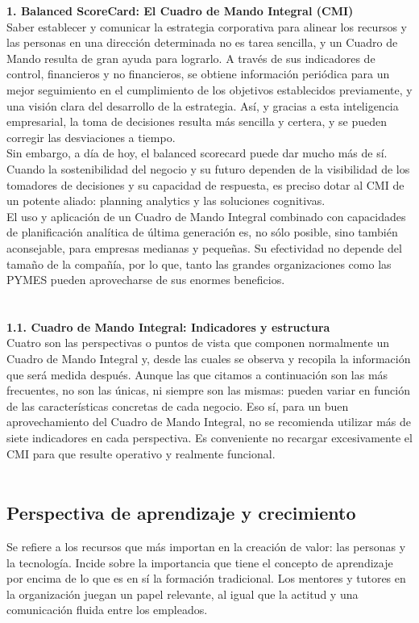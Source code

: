\documentclass[twoside,twocolumn]{article}
\begin{document}
\begin{flushright}
\begin{itemize}
\textbf{1.  Balanced ScoreCard: El Cuadro de Mando Integral (CMI)}\\
Saber establecer y comunicar la estrategia corporativa para alinear los recursos y las personas en una dirección determinada no es tarea sencilla, y un Cuadro de Mando resulta de gran ayuda para lograrlo. A través de sus indicadores de control, financieros y no financieros, se obtiene información periódica para un mejor seguimiento en el cumplimiento de los objetivos establecidos previamente, y una visión clara del desarrollo de la estrategia. Así, y gracias a esta inteligencia empresarial, la toma de decisiones resulta más sencilla y certera, y se pueden corregir las desviaciones a tiempo.\\
Sin embargo, a día de hoy, el balanced scorecard puede dar mucho más de sí.
\textbf{}\\
Cuando la sostenibilidad del negocio y su futuro dependen de la visibilidad de los tomadores de decisiones y su capacidad de respuesta, es preciso dotar al CMI de un potente aliado: planning analytics y las soluciones cognitivas.\\
El uso y aplicación de un Cuadro de Mando Integral combinado con capacidades de planificación analítica de última generación es, no sólo posible, sino también aconsejable, para empresas medianas y pequeñas. Su efectividad no depende del tamaño de la compañía, por lo que, tanto las grandes organizaciones como las PYMES pueden aprovecharse de sus enormes beneficios.\\

\textbf{}\\\textbf{}\\
 \textbf{1.1.  Cuadro de Mando Integral: Indicadores y estructura }\\
Cuatro son las perspectivas o puntos de vista que componen normalmente un Cuadro de Mando Integral y, desde las cuales se observa y recopila la información que será medida después. Aunque las que citamos a continuación son las más frecuentes, no son las únicas, ni siempre son las mismas: pueden variar en función de las características concretas de cada negocio.
Eso sí, para un buen aprovechamiento del Cuadro de Mando Integral, no se recomienda utilizar más de siete indicadores en cada perspectiva. Es conveniente no recargar excesivamente el CMI para que resulte operativo y realmente funcional.\\
\textbf{}\\

\subsection{Perspectiva de aprendizaje y crecimiento}
Se refiere a los recursos que más importan en la creación de valor: las personas y la tecnología. Incide sobre la importancia que tiene el concepto de aprendizaje por encima de lo que es en sí la formación tradicional. Los mentores y tutores en la organización juegan un papel relevante, al igual que la actitud y una comunicación fluida entre los empleados.
\textbf{}\\\textbf{}\\

\end{itemize}
\end{flushright}
\end{document}
